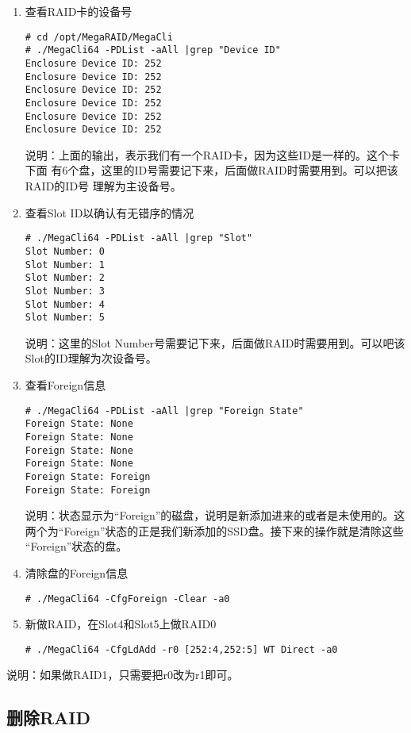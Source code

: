 \begin{enumerate}[itemsep=0pt,parsep=0pt]
\item 查看RAID卡的设备号
\begin{verbatim}
# cd /opt/MegaRAID/MegaCli
# ./MegaCli64 -PDList -aAll |grep "Device ID"
Enclosure Device ID: 252
Enclosure Device ID: 252 
Enclosure Device ID: 252
Enclosure Device ID: 252
Enclosure Device ID: 252
Enclosure Device ID: 252
\end{verbatim}

说明：上面的输出，表示我们有一个RAID卡，因为这些ID是一样的。这个卡下面
有6个盘，这里的ID号需要记下来，后面做RAID时需要用到。可以把该RAID的ID号
理解为主设备号。
	
\item 查看Slot ID以确认有无错序的情况
\begin{verbatim}
# ./MegaCli64 -PDList -aAll |grep "Slot"  
Slot Number: 0
Slot Number: 1
Slot Number: 2
Slot Number: 3
Slot Number: 4
Slot Number: 5
\end{verbatim}

说明：这里的Slot Number号需要记下来，后面做RAID时需要用到。可以吧该
Slot的ID理解为次设备号。
	
\item 查看Foreign信息
\begin{verbatim}
# ./MegaCli64 -PDList -aAll |grep "Foreign State"
Foreign State: None
Foreign State: None 
Foreign State: None
Foreign State: None
Foreign State: Foreign 
Foreign State: Foreign 
\end{verbatim}

说明：状态显示为“Foreign”的磁盘，说明是新添加进来的或者是未使用的。这
两个为“Foreign”状态的正是我们新添加的SSD盘。接下来的操作就是清除这些
“Foreign”状态的盘。
	
\item 清除盘的Foreign信息
\begin{verbatim}
# ./MegaCli64 -CfgForeign -Clear -a0
\end{verbatim}
	
\item 新做RAID，在Slot4和Slot5上做RAID0
\begin{verbatim}
# ./MegaCli64 -CfgLdAdd -r0 [252:4,252:5] WT Direct -a0
\end{verbatim}
\end{enumerate}

说明：如果做RAID1，只需要把r0改为r1即可。

\subsection{删除RAID}

